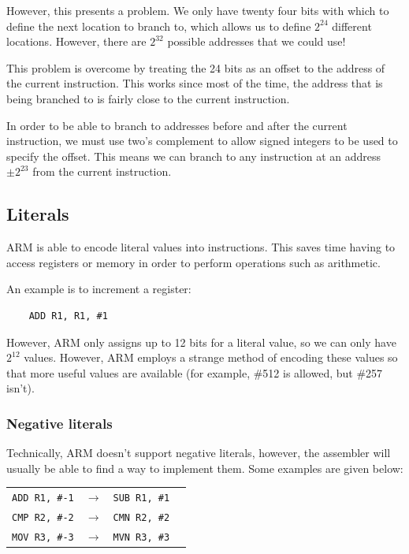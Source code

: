 \documentclass{article}
\begin{document}
However, this presents a problem. We only have twenty four bits with which to define the next location to branch to, which allows us to define $2^24$ different locations. However, there are $2^32$ possible addresses that we could use!

This problem is overcome by treating the 24 bits as an offset to the address of the current instruction. This works since most of the time, the address that is being branched to is fairly close to the current instruction.

In order to be able to branch to addresses before and after the current instruction, we must use two's complement to allow signed integers to be used to specify the offset. This means we can branch to any instruction at an address $\pm 2^{23}$ from the current instruction.

\subsection{Literals}

ARM is able to encode literal values into instructions. This saves time having to access registers or memory in order to perform operations such as arithmetic.

An example is to increment a register:

\begin{verbatim}
	ADD	R1, R1, #1
\end{verbatim}

However, ARM only assigns up to 12 bits for a literal value, so we can only have $2^{12}$ values. However, ARM employs a strange method of encoding these values so that more useful values are available (for example, \#512 is allowed, but \#257 isn't).

\subsubsection{Negative literals}

Technically, ARM doesn't support negative literals, however, the assembler will usually be able to find a way to implement them. Some examples are given below:

\begin{center}
    \begin{tabular}{l l l r}
        {\tt ADD R1, \#-1} & $\rightarrow$ & {\tt SUB R1, \#1}\\
        {\tt CMP R2, \#-2} & $\rightarrow$ & {\tt CMN R2, \#2}\\
        {\tt MOV R3, \#-3} & $\rightarrow$ & {\tt MVN R3, \#3}\\
    \end{tabular}
\end{center}
\end{document}

